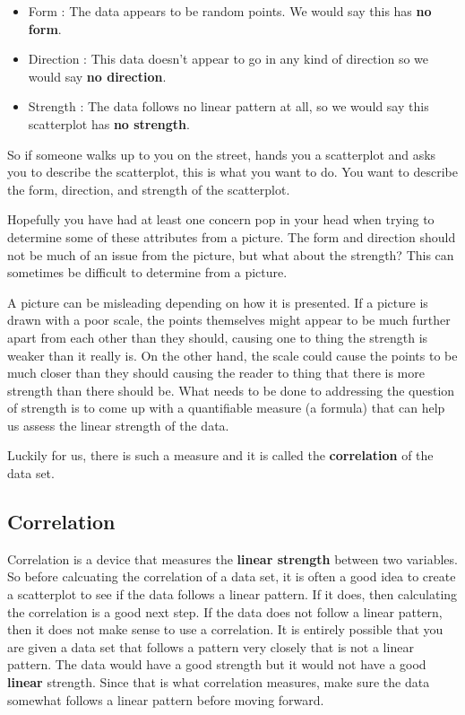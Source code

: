 \documentclass[
  letterpaper,
  DIV=11,
  numbers=noendperiod]{scrreprt}
\providecommand{\tightlist}{%
  \setlength{\itemsep}{0pt}\setlength{\parskip}{0pt}}\usepackage{longtable,booktabs,array}
\begin{document}
\begin{itemize}
\tightlist
\item
  Form : The data appears to be random points. We would say this has
  \textbf{no form}.
\item
  Direction : This data doesn't appear to go in any kind of direction so
  we would say \textbf{no direction}.
\item
  Strength : The data follows no linear pattern at all, so we would say
  this scatterplot has \textbf{no strength}.
\end{itemize}

So if someone walks up to you on the street, hands you a scatterplot and
asks you to describe the scatterplot, this is what you want to do. You
want to describe the form, direction, and strength of the scatterplot.

Hopefully you have had at least one concern pop in your head when trying
to determine some of these attributes from a picture. The form and
direction should not be much of an issue from the picture, but what
about the strength? This can sometimes be difficult to determine from a
picture.

A picture can be misleading depending on how it is presented. If a
picture is drawn with a poor scale, the points themselves might appear
to be much further apart from each other than they should, causing one
to thing the strength is weaker than it really is. On the other hand,
the scale could cause the points to be much closer than they should
causing the reader to thing that there is more strength than there
should be. What needs to be done to addressing the question of strength
is to come up with a quantifiable measure (a formula) that can help us
assess the linear strength of the data.

Luckily for us, there is such a measure and it is called the
\textbf{correlation} of the data set.

\subsection*{Correlation}\label{correlation}

Correlation is a device that measures the \textbf{linear strength}
between two variables. So before calcuating the correlation of a data
set, it is often a good idea to create a scatterplot to see if the data
follows a linear pattern. If it does, then calculating the correlation
is a good next step. If the data does not follow a linear pattern, then
it does not make sense to use a correlation. It is entirely possible
that you are given a data set that follows a pattern very closely that
is not a linear pattern. The data would have a good strength but it
would not have a good \textbf{linear} strength. Since that is what
correlation measures, make sure the data somewhat follows a linear
pattern before moving forward.
\end{document}
